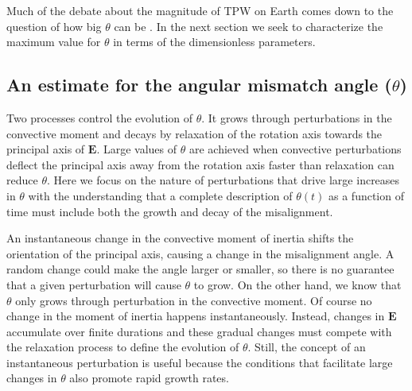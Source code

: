 \documentclass[preprint,12pt,authoryear]{elsarticle}
\begin{document}
 Much of the debate about the magnitude of TPW on Earth comes down to the question of how big $\theta$ can be \citep{kirschvink1997evidence, steinberger1997changes}. In the next section we seek to characterize the maximum value for $\theta$ in terms of the dimensionless parameters.


\subsection{An estimate for the angular mismatch angle ($\theta$)}
\label{sec:theta}



Two processes control the evolution of $\theta$. It grows through perturbations in the convective moment and  decays by relaxation of the rotation axis towards the principal axis of $\mathbf{E}$. Large values of $\theta$ are achieved when
convective perturbations deflect the principal axis away from the rotation axis faster than relaxation can reduce $\theta$. Here we focus on the nature of
perturbations that drive large increases in $\theta$ with the understanding that a complete description of $\theta(t)$ as a function of time must include both the growth and decay of the misalignment. 


An instantaneous change in the convective moment of inertia shifts the orientation of the principal axis, causing a change in the misalignment angle. A random change could make the angle larger or smaller, so there is no guarantee that a given perturbation will cause $\theta$ to grow. On the other hand,  we know that $\theta$ only grows through perturbation in the convective moment. Of course no change in the moment of inertia happens instantaneously. Instead,  changes in $\mathbf{E}$ accumulate over  finite durations and these gradual changes must compete with the relaxation process to define the evolution of $\theta$. Still, the concept of an instantaneous perturbation is useful because the conditions that facilitate large changes in $\theta$ also promote rapid growth rates. 
\end{document}
